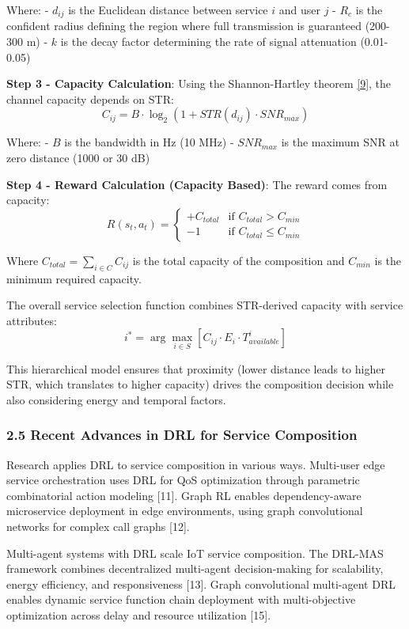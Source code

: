 Where: - \(d_{ij}\) is the Euclidean distance between service \(i\) and
user \(j\) - \(R_c\) is the confident radius defining the region where
full transmission is guaranteed (200-300 m) - \(k\) is the decay factor
determining the rate of signal attenuation (0.01-0.05)

\textbf{Step 3 - Capacity Calculation}: Using the Shannon-Hartley
theorem \hyperlink{cite.shannon1948}{\hyperlink{cite.shannon1948}{[9]}}, the channel capacity depends on STR:
\[C_{ij} = B \cdot \log_2(1 + STR(d_{ij}) \cdot SNR_{max})\]

Where: - \(B\) is the bandwidth in Hz (10 MHz) - \(SNR_{max}\) is the
maximum SNR at zero distance (1000 or 30 dB)

\textbf{Step 4 - Reward Calculation (Capacity Based)}: The reward comes
from capacity:
\[R(s_t, a_t) = \begin{cases} +C_{total} & \text{if } C_{total} > C_{min} \\ -1 & \text{if } C_{total} \leq C_{min} \end{cases}\]

Where \(C_{total} = \sum_{i \in C} C_{ij}\) is the total capacity of the
composition and \(C_{min}\) is the minimum required capacity.

The overall service selection function combines STR-derived capacity
with service attributes:
\[i^* = \arg\max_{i \in S} \left[ C_{ij} \cdot E_i \cdot T_{available}^i \right]\]

This hierarchical model ensures that proximity (lower distance leads to
higher STR, which translates to higher capacity) drives the composition
decision while also considering energy and temporal factors.

\hypertarget{recent-advances-in-drl-for-service-composition}{%
	\subsubsection{2.5 Recent Advances in DRL for Service
		Composition}\label{recent-advances-in-drl-for-service-composition}}

Research applies DRL to service composition in various ways. Multi-user
edge service orchestration uses DRL for QoS optimization through
parametric combinatorial action modeling {[}11{]}. Graph RL enables
dependency-aware microservice deployment in edge environments, using
graph convolutional networks for complex call graphs {[}12{]}.

Multi-agent systems with DRL scale IoT service composition. The DRL-MAS
framework combines decentralized multi-agent decision-making for
scalability, energy efficiency, and responsiveness {[}13{]}. Graph
convolutional multi-agent DRL enables dynamic service function chain
deployment with multi-objective optimization across delay and resource
utilization {[}15{]}.

